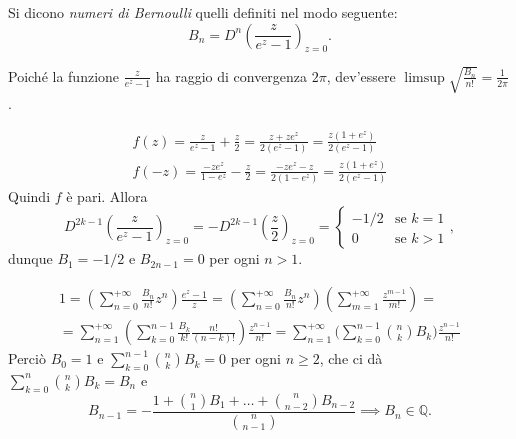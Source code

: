 \begin{defn}
  Si dicono \textit{numeri di Bernoulli} quelli definiti nel modo seguente:
  $$B_n=D^n\left(\frac{z}{e^z-1}\right)_{z=0}.$$
\end{defn}

\begin{oss}
  Poiché la funzione $\frac{z}{e^z-1}$ ha raggio di convergenza $2\pi$, dev'essere $\displaystyle \limsup \sqrt{\frac{B_n}{n!}}=\frac{1}{2\pi}$.
\end{oss}

\begin{oss}
  \begin{gather*}
    f(z)=\frac{z}{e^z-1}+\frac{z}{2}=\frac{z+ze^z}{2(e^z-1)}=\frac{z(1+e^z)}{2(e^z-1)} \\
    f(-z)=\frac{-ze^z}{1-e^z}-\frac{z}{2}=\frac{-ze^z-z}{2(1-e^z)}=\frac{z(1+e^z)}{2(e^z-1)}
  \end{gather*}
  Quindi $f$ è pari. Allora
  $$D^{2k-1}\left(\frac{z}{e^z-1}\right)_{z=0}=-D^{2k-1}\left(\frac{z}{2}\right)_{z=0}=\begin{cases}
    -1/2 & \mbox{se }k=1 \\ 0 & \mbox{se } k>1
\end{cases},$$
dunque $B_1=-1/2$ e $B_{2n-1}=0$ per ogni $n>1$.
\end{oss}

\begin{oss}
  \begin{gather*}
    1=\left(\sum_{n=0}^{+\infty}\frac{B_n}{n!}z^n\right)\frac{e^z-1}{z}=\left(\sum_{n=0}^{+\infty}\frac{B_n}{n!}z^n\right)\left(\sum_{m=1}^{+\infty}\frac{z^{m-1}}{m!}\right)= \\
    =\sum_{n=1}^{+\infty}\left(\sum_{k=0}^{n-1}\frac{B_k}{k!}\frac{n!}{(n-k)!}\right)\frac{z^{n-1}}{n!}=\sum_{n=1}^{+\infty}\Bigg(\sum_{k=0}^{n-1}\binom{n}{k}B_k\Bigg)\frac{z^{n-1}}{n!}
  \end{gather*}
  Perciò $B_0=1$ e $\displaystyle \sum_{k=0}^{n-1}\binom{n}{k}B_k=0$ per ogni $n \ge 2$, che ci dà $\displaystyle \sum_{k=0}^n\binom{n}{k}B_k=B_n$ e
  $$B_{n-1}=-\frac{1+\binom{n}{1}B_1+\dots+\binom{n}{n-2}B_{n-2}}{\binom{n}{n-1}} \implies B_n \in \mathbb{Q}.$$
\end{oss}


